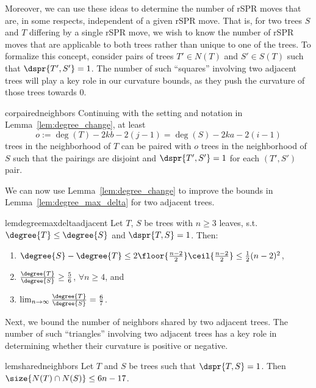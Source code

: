 \documentclass[10pt,twoside,leqno,twocolumn]{article}
\newcommand{\cuttable}[2][]{%
    \ifthenelse{\equal{#1}{}}%
		{}%
		{#1}%
}
\begin{document}
Moreover, we can use these ideas to determine the number of rSPR moves that are, in some respects, independent of a given rSPR move.
That is, for two trees $S$ and $T$ differing by a single rSPR move, we wish to know the number of rSPR moves that are applicable to both trees rather than unique to one of the trees.
To formalize this concept, consider pairs of trees $T' \in N(T)$ and $S' \in S(T)$ such that $\dspr{T',S'} = 1$.
The number of such ``squares'' involving two adjacent trees will play a key role in our curvature bounds, as they push the curvature of those trees towards 0.

\begin{restatable}{cor}{pairedneighbors}
\label{cor:paired_neighbors}
Continuing with the setting and notation in Lemma~\ref{lem:degree_change}, at least
$$o := \deg(T) - 2kb - 2(j-1) = \deg(S) - 2ka - 2(i-1)$$
trees in the neighborhood of $T$ can be paired with $o$ trees in the neighborhood of $S$ such that the pairings are disjoint and $\dspr{T',S'} = 1$ for each $(T',S')$ pair.
\end{restatable}

We can now use Lemma~\ref{lem:degree_change} to improve the bounds in Lemma~\ref{lem:degree_max_delta} for two adjacent trees.
\begin{restatable}{lem}{degreemaxdeltaadjacent}
	\label{lem:degree_max_delta_adjacent}
	Let $T$, $S$ be trees with $n \ge 3$ leaves, s.t. $\degree{T} \le \degree{S}$ and $\dspr{T,S} = 1$.
	Then:
	\begin{enumerate}
		\item $\degree{S} - \degree{T} \le 2\floor{\frac{n-2}{2}}\ceil{\frac{n-2}{2}} \le \frac{1}{2} (n-2)^2 $,
		\item $\frac{\degree{T}}{\degree{S}} \ge \frac{5}{6}$, $\forall n \ge 4$, and
		\item $\lim_{n\rightarrow\infty}\frac{\degree{T}}{\degree{S}} =  \frac{6}{7}$.
	\end{enumerate}
\end{restatable}


Next, we bound the number of neighbors shared by two adjacent trees.
The number of such ``triangles'' involving two adjacent trees has a key role in determining whether \cuttable[their]{the} curvature \cuttable{of two adjacent trees }is positive or negative.

\begin{restatable}{lem}{sharedneighbors}
	\label{lem:shared_neighbors}
Let $T$ and $S$ be trees such that $\dspr{T,S} = 1$.
Then $\size{N(T) \cap N(S)} \le 6n - 17$.
\end{restatable}
\end{document}
